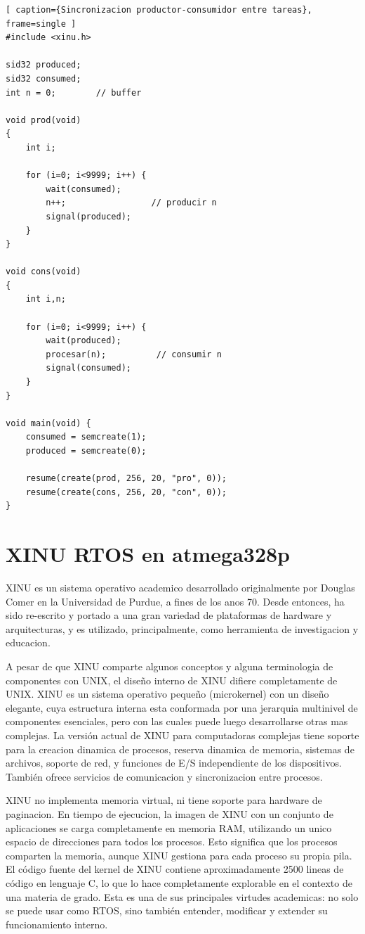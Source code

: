 \documentclass[output=paper, 
colorlinks,
citecolor=brown,
newtxmath
]{langscibook}
\begin{document}
\begin{lstlisting}[ caption={Sincronizacion productor-consumidor entre tareas}, frame=single ]
#include <xinu.h>

sid32 produced;
sid32 consumed;
int n = 0;        // buffer

void prod(void)
{
    int i;

    for (i=0; i<9999; i++) {
        wait(consumed);
        n++;                 // producir n
        signal(produced);
    }
}

void cons(void)
{
    int i,n;

    for (i=0; i<9999; i++) {
        wait(produced);
        procesar(n);          // consumir n
        signal(consumed);
    }
}

void main(void) {
    consumed = semcreate(1);	
    produced = semcreate(0);	

    resume(create(prod, 256, 20, "pro", 0));
    resume(create(cons, 256, 20, "con", 0));
}
\end{lstlisting}



\section{XINU RTOS en atmega328p}

XINU es un sistema operativo academico desarrollado originalmente por Douglas Comer en la Universidad de Purdue, a fines de los anos 70. Desde entonces, ha sido re-escrito y portado a una gran variedad de plataformas de hardware y arquitecturas, y es utilizado, principalmente, como herramienta de investigacion y educacion.

A pesar de que XINU comparte algunos conceptos y alguna terminologia de componentes con UNIX, el diseño interno de XINU difiere completamente de UNIX. 
XINU es un sistema operativo pequeño (microkernel) con un diseño elegante, 
cuya estructura interna esta conformada por una jerarquia multinivel de 
componentes esenciales, pero con las cuales puede luego desarrollarse 
otras mas complejas. La versión actual de XINU para computadoras complejas tiene soporte para la creacion dinamica de procesos, reserva dinamica de memoria, sistemas de archivos, soporte de red, y funciones de E/S independiente de los dispositivos. También ofrece servicios de comunicacion y sincronizacion entre procesos.

XINU no implementa memoria virtual, ni tiene soporte para hardware de 
paginacion. En tiempo de ejecucion, la imagen de XINU con un conjunto 
de aplicaciones se carga completamente en memoria RAM, 
utilizando un unico espacio de direcciones para todos los procesos. 
Esto significa que los procesos comparten la memoria, aunque XINU gestiona para cada proceso su propia pila.
El código fuente del kernel de XINU contiene aproximadamente 
2500 lineas de código en lenguaje C, lo que lo hace completamente 
explorable en el contexto de una materia de grado. Esta es 
una de sus principales virtudes academicas: no solo se puede usar 
como RTOS, sino también entender, modificar y extender su 
funcionamiento interno.
\end{document}
